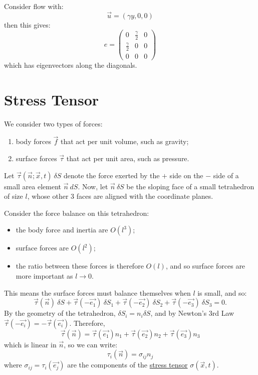 \documentclass[../Main.tex]{subfiles}
\begin{document}
\begin{example}
    Consider flow with:
    \begin{equation*}
        \vec{u} = (\gamma y, 0, 0)
    \end{equation*}
    then this gives:
    \begin{equation*}
        e =
        \begin{pmatrix}
            0 & \frac\gamma2 & 0 \\
            \frac\gamma2 & 0 & 0 \\
            0 & 0 & 0
        \end{pmatrix}
    \end{equation*}
    which has eigenvectors along the diagonals.
\end{example}
\section{Stress Tensor}
We consider two types of forces:
\begin{enumerate}
    \item body forces $\vec{f}$ that act per unit volume, such as gravity;
    \item surface forces $\vec\tau$ that act per unit area, such as pressure.
\end{enumerate}
Let $\vec\tau(\vec{n}; \vec{x}, t)~\delta S$ denote the force exerted by the $+$ side on the $-$ side of a small area element $\vec{n}~dS$. Now, let $\vec{n}~\delta S$ be the sloping face of a small tetrahedron of size $l$, whose other 3 faces are aligned with the coordinate planes.

Consider the force balance on this tetrahedron:
\begin{itemize}
    \item the body force and inertia are $O(l^3)$;
    \item surface forces are $O(l^2)$;
    \item the ratio between these forces is therefore $O(l)$, and so surface forces are more important as $l \to 0$.
\end{itemize}
This means the surface forces must balance themselves when $l$ is small, and so:
\begin{equation*}
    \vec\tau(\vec{n})~\delta S + \vec{\tau}(-\vec{e_1})~\delta S_1 + \vec\tau(-\vec{e_2})~\delta S_2 + \vec{\tau}(-\vec{e_3})~\delta S_3 = 0.
\end{equation*}
By the geometry of the tetrahedron, $\delta S_i = n_i \delta S$, and by Newton's 3rd Law $\vec{\tau}(-\vec{e_i}) = -\vec\tau(\vec{e_i})$. Therefore,
\begin{equation*}
    \vec\tau(\vec{n}) = \vec\tau(\vec{e_1}) n_1 + \vec\tau(\vec{e_2}) n_2 + \vec\tau(\vec{e_3}) n_3
\end{equation*}
which is linear in $\vec{n}$, so we can write:
\begin{equation*}
    \tau_i(\vec{n}) = \sigma_{ij} n_j
\end{equation*}
where $\sigma_{ij} = \tau_i(\vec{e_j})$ are the components of the \underline{stress tensor} $\sigma(\vec{x}, t)$.
\end{document}
